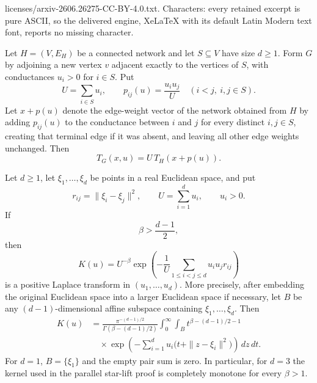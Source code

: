 \documentclass[10pt,a4paper]{amsart}
\begin{document}
licenses/arxiv-2606.26275-CC-BY-4.0.txt. Characters: every retained excerpt is pure ASCII, so the delivered engine, XeLaTeX with its default Latin Modern text font, reports no missing character.
\begin{lemma}
\label{lem:starmesh}
Let \(H=(V,E_H)\) be a connected network and let \(S\subseteq V\) have size \(d\ge1\).  Form \(G\) by adjoining a new vertex \(v\) adjacent exactly to the vertices of \(S\), with conductances \(u_i>0\) for \(i\in S\).  Put
\begin{equation}
        U=\sum_{i\in S}u_i,
        \qquad
        p_{ij}(u)=\frac{u_i u_j}{U}
        \quad (i<j,\ i,j\in S).
\end{equation}
Let \(x+p(u)\) denote the edge-weight vector of the network obtained from \(H\) by adding \(p_{ij}(u)\) to the conductance between \(i\) and \(j\) for every distinct \(i,j\in S\), creating that terminal edge if it was absent, and leaving all other edge weights unchanged.  Then
\begin{equation}
        T_G(x,u)=U\,T_H(x+p(u)).
\end{equation}
\end{lemma}

\begin{lemma}
\label{lem:gaussian-star}
Let \(d\ge1\), let \(\xi_1,\ldots,\xi_d\) be points in a real Euclidean space, and put
\begin{equation}
        r_{ij}=\|\xi_i-\xi_j\|^2,
        \qquad
        U=\sum_{i=1}^d u_i,
        \qquad
        u_i>0.
\end{equation}
If
\begin{equation}
        \beta>\frac{d-1}{2},
\end{equation}
then
\begin{equation}
        K(u)
        =
        U^{-\beta}
        \exp\left(
        -\frac1U\sum_{1\le i<j\le d}u_i u_j r_{ij}
        \right)
\end{equation}
is a positive Laplace transform in \((u_1,\ldots,u_d)\).  More precisely, after embedding the original Euclidean space into a larger Euclidean space if necessary, let \(B\) be any \((d-1)\)-dimensional affine subspace containing \(\xi_1,\ldots,\xi_d\).  Then
\begin{equation}
\begin{aligned}
        K(u)
        &=
        \frac{\pi^{-(d-1)/2}}{\Gamma(\beta-(d-1)/2)}
        \int_0^\infty\int_B
        t^{\beta-(d-1)/2-1}  \\
        &\quad\times
        \exp\left(
        -\sum_{i=1}^d u_i\bigl(t+\|z-\xi_i\|^2\bigr)
        \right)\,dz\,dt .
\end{aligned}
\end{equation}
For \(d=1\), \(B=\{\xi_1\}\) and the empty pair sum is zero.  In particular, for \(d=3\) the kernel used in the parallel star-lift proof is completely monotone for every \(\beta>1\).
\end{lemma}
\end{document}
